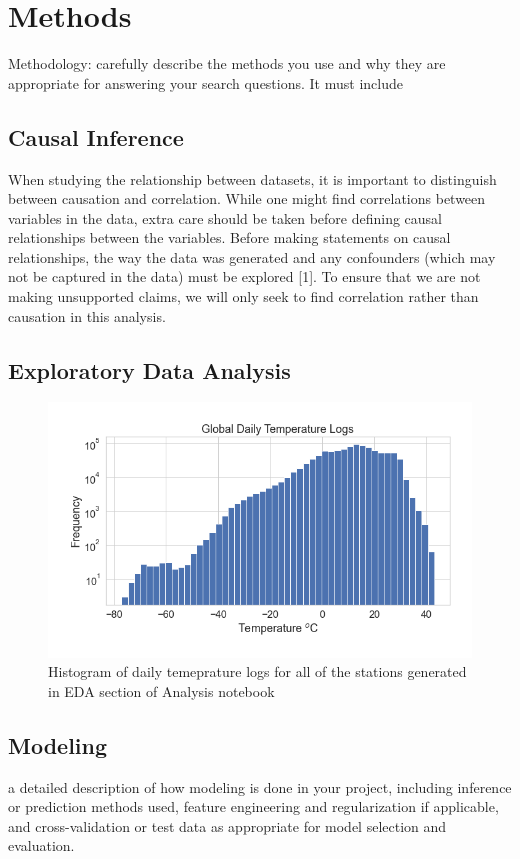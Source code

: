 \section{Methods}
Methodology: carefully describe the methods you use and why they are appropriate for answering your search questions. It must include
\subsection{Causal Inference}
When studying the relationship between datasets, it is important to distinguish between causation and correlation. While one might find correlations between variables in the data, extra care should be taken before defining causal relationships between the variables. Before making statements on causal relationships, the way the data was generated and any confounders (which may not be captured in the data) must be explored [1]. To ensure that we are not making unsupported claims, we will only seek to find correlation rather than causation in this analysis. 

\subsection{Exploratory Data Analysis}

\begin{figure}
    \centering
    \includegraphics[width=\columnwidth]{figures/DailyTempHist.png}
    \caption{Histogram of daily temeprature logs for all of the stations generated in EDA section of Analysis notebook}
    \label{fig:my_label}
\end{figure}


\subsection{Modeling}
a detailed description of how modeling is done in your project, including inference or prediction methods used, feature engineering and regularization if applicable, and cross-validation or test data as appropriate for model selection and evaluation.
